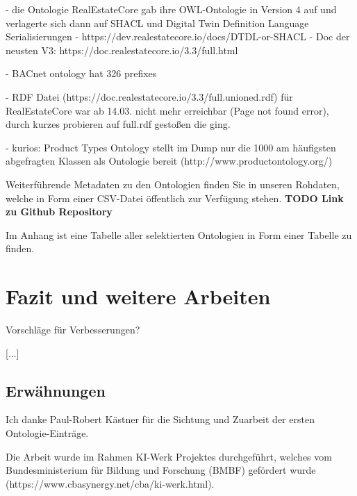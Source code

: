 \documentclass{article}
\begin{document}
- die Ontologie RealEstateCore gab ihre OWL-Ontologie in Version 4 auf und verlagerte sich dann auf SHACL und Digital Twin Definition Language Serialisierungen
- https://dev.realestatecore.io/docs/DTDL-or-SHACL
- Doc der neusten V3: https://doc.realestatecore.io/3.3/full.html

- BACnet ontology hat 326 prefixes

- RDF Datei (https://doc.realestatecore.io/3.3/full.unioned.rdf) für RealEstateCore war ab 14.03. nicht mehr erreichbar (Page not found error),
durch kurzes probieren auf full.rdf gestoßen die ging.

- kurios: Product Types Ontology stellt im Dump nur die 1000 am häufigsten abgefragten Klassen als Ontologie bereit (http://www.productontology.org/)








Weiterführende Metadaten zu den Ontologien finden Sie in unseren Rohdaten, welche in Form einer CSV-Datei öffentlich zur Verfügung stehen. \textbf{TODO Link zu Github Repository}

Im Anhang ist eine Tabelle aller selektierten Ontologien in Form einer Tabelle zu finden.


\section{Fazit und weitere Arbeiten}

Vorschläge für Verbesserungen?

[...]

\subsection{Erwähnungen}

Ich danke Paul-Robert Kästner für die Sichtung und Zuarbeit der ersten Ontologie-Einträge.

Die Arbeit wurde im Rahmen KI-Werk Projektes durchgeführt, welches vom Bundesministerium für Bildung und Forschung (BMBF) gefördert wurde (https://www.cbasynergy.net/cba/ki-werk.html).



\medskip

\printbibliography
\end{document}
